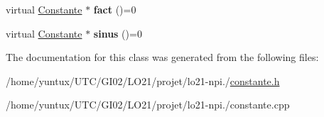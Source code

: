 \begin{DoxyCompactItemize}
\item 
\hypertarget{class_constante_a57dafd18c718935af9f97dcbb8de9ad9}{virtual \hyperlink{class_constante}{\-Constante} $\ast$ {\bfseries fact} ()=0}\label{class_constante_a57dafd18c718935af9f97dcbb8de9ad9}

\item 
\hypertarget{class_constante_ad1a0ed2f6f6e9c3e7fc3f0c4ffaeaa76}{virtual \hyperlink{class_constante}{\-Constante} $\ast$ {\bfseries sinus} ()=0}\label{class_constante_ad1a0ed2f6f6e9c3e7fc3f0c4ffaeaa76}

\end{DoxyCompactItemize}


\-The documentation for this class was generated from the following files\-:\begin{DoxyCompactItemize}
\item 
/home/yuntux/\-U\-T\-C/\-G\-I02/\-L\-O21/projet/lo21-\/npi./\hyperlink{constante_8h}{constante.\-h}\item 
/home/yuntux/\-U\-T\-C/\-G\-I02/\-L\-O21/projet/lo21-\/npi./constante.\-cpp\end{DoxyCompactItemize}
